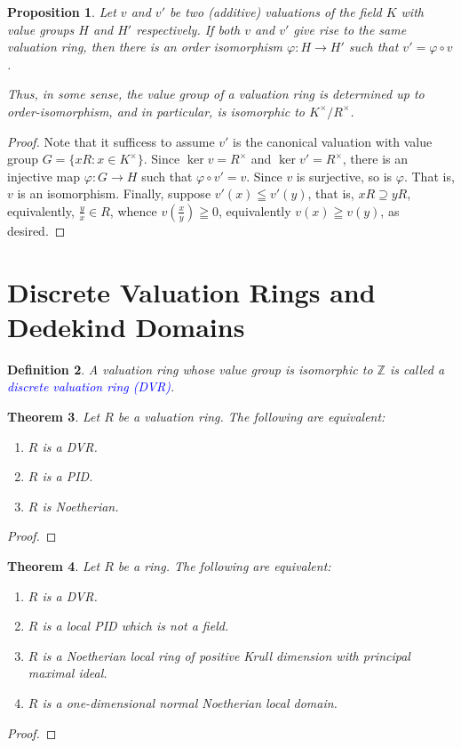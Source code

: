 \documentclass[11pt]{article}
\theoremstyle{thmstyle}
\newtheorem{theorem}{Theorem}[section]
\newtheorem{proposition}[theorem]{Proposition}
\theoremstyle{defstyle}
\newtheorem{definition}[theorem]{Definition}
\newcommand{\Z}{\mathbb{Z}}
\newcommand{\define}[1]{\textcolor{blue}{\textit{#1}}}
\begin{document}
\begin{proposition}
    Let $v$ and $v'$ be two (additive) valuations of the field $K$ with value groups $H$ and $H'$ respectively. If both $v$ and $v'$ give rise to the same valuation ring, then there is an order isomorphism $\varphi\colon H\to H'$ such that $v' = \varphi\circ v$.

    Thus, in some sense, the value group of a valuation ring is determined up to order-isomorphism, and in particular, is isomorphic to $K^\times/R^\times$.
\end{proposition}
\begin{proof}
    Note that it sufficess to assume $v'$ is the canonical valuation with value group $G = \{xR\colon x\in K^\times\}$. Since $\ker v = R^\times$ and $\ker v' = R^\times$, there is an injective map $\varphi\colon G\to H$ such that $\varphi\circ v' = v$. Since $v$ is surjective, so is $\varphi$. That is, $v$ is an isomorphism. Finally, suppose $v'(x)\leqq v'(y)$, that is, $xR\supseteq yR$, equivalently, $\frac{y}{x}\in R$, whence $v\left(\frac{x}{y}\right)\geqq 0$, equivalently $v(x)\geqq v(y)$, as desired.
\end{proof}

\section{Discrete Valuation Rings and Dedekind Domains}

\begin{definition}
    A valuation ring whose value group is isomorphic to $\Z$ is called a \define{discrete valuation ring (DVR)}.
\end{definition}

\begin{theorem}
    Let $R$ be a valuation ring. The following are equivalent: 
    \begin{enumerate}[label=(\arabic*)]
        \item $R$ is a DVR. 
        \item $R$ is a PID. 
        \item $R$ is Noetherian.
    \end{enumerate}
\end{theorem}
\begin{proof}
    
\end{proof}

\begin{theorem}
    Let $R$ be a ring. The following are equivalent: 
    \begin{enumerate}[label=(\arabic*)]
        \item $R$ is a DVR.
        \item $R$ is a local PID which is not a field. 
        \item $R$ is a Noetherian local ring of positive Krull dimension with principal maximal ideal. 
        \item $R$ is a one-dimensional normal Noetherian local domain.
    \end{enumerate}
\end{theorem}
\begin{proof}
    
\end{proof}
\end{document}
